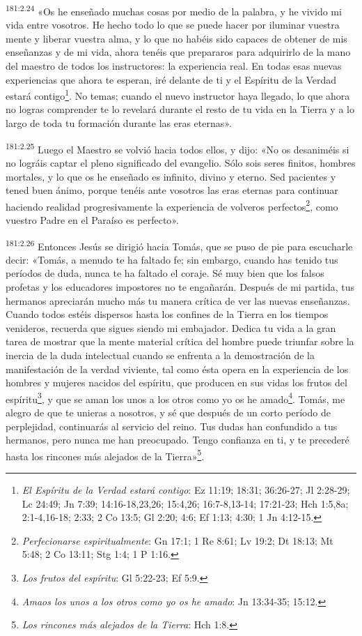 \par
\textsuperscript{181:2.24} «Os he enseñado muchas cosas por medio de la palabra, y he vivido mi vida entre vosotros. He hecho todo lo que se puede hacer por iluminar vuestra mente y liberar vuestra alma, y lo que no habéis sido capaces de obtener de mis enseñanzas y de mi vida, ahora tenéis que prepararos para adquirirlo de la mano del maestro de todos los instructores: la experiencia real. En todas esas nuevas experiencias que ahora te esperan, iré delante de ti y el Espíritu de la Verdad estará contigo\footnote{\textit{El Espíritu de la Verdad estará contigo}: Ez 11:19; 18:31; 36:26-27; Jl 2:28-29; Lc 24:49; Jn 7:39; 14:16-18,23,26; 15:4,26; 16:7-8,13-14; 17:21-23; Hch 1:5,8a; 2:1-4,16-18; 2:33; 2 Co 13:5; Gl 2:20; 4:6; Ef 1:13; 4:30; 1 Jn 4:12-15.}. No temas; cuando el nuevo instructor haya llegado, lo que ahora no logras comprender te lo revelará durante el resto de tu vida en la Tierra y a lo largo de toda tu formación durante las eras eternas».

\par
\textsuperscript{181:2.25} Luego el Maestro se volvió hacia todos ellos, y dijo: «No os desaniméis si no lográis captar el pleno significado del evangelio. Sólo sois seres finitos, hombres mortales, y lo que os he enseñado es infinito, divino y eterno. Sed pacientes y tened buen ánimo, porque tenéis ante vosotros las eras eternas para continuar haciendo realidad progresivamente la experiencia de volveros perfectos\footnote{\textit{Perfecionarse espiritualmente}: Gn 17:1; 1 Re 8:61; Lv 19:2; Dt 18:13; Mt 5:48; 2 Co 13:11; Stg 1:4; 1 P 1:16.}, como vuestro Padre en el Paraíso es perfecto».

\par
\textsuperscript{181:2.26} Entonces Jesús se dirigió hacia Tomás, que se puso de pie para escucharle decir: «Tomás, a menudo te ha faltado fe; sin embargo, cuando has tenido tus períodos de duda, nunca te ha faltado el coraje. Sé muy bien que los falsos profetas y los educadores impostores no te engañarán. Después de mi partida, tus hermanos apreciarán mucho más tu manera crítica de ver las nuevas enseñanzas. Cuando todos estéis dispersos hasta los confines de la Tierra en los tiempos venideros, recuerda que sigues siendo mi embajador. Dedica tu vida a la gran tarea de mostrar que la mente material crítica del hombre puede triunfar sobre la inercia de la duda intelectual cuando se enfrenta a la demostración de la manifestación de la verdad viviente, tal como ésta opera en la experiencia de los hombres y mujeres nacidos del espíritu, que producen en sus vidas los frutos del espíritu\footnote{\textit{Los frutos del espíritu}: Gl 5:22-23; Ef 5:9.}, y que se aman los unos a los otros como yo os he amado\footnote{\textit{Amaos los unos a los otros como yo os he amado}: Jn 13:34-35; 15:12.}. Tomás, me alegro de que te unieras a nosotros, y sé que después de un corto período de perplejidad, continuarás al servicio del reino. Tus dudas han confundido a tus hermanos, pero nunca me han preocupado. Tengo confianza en ti, y te precederé hasta los rincones más alejados de la Tierra»\footnote{\textit{Los rincones más alejados de la Tierra}: Hch 1:8.}.

